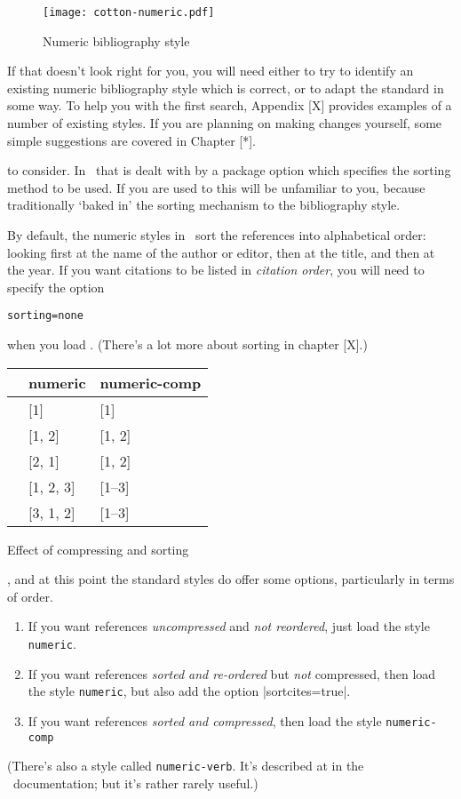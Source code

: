 \begin{figure}
\texttt{[image: cotton-numeric.pdf]}
\caption{Numeric bibliography style\label{numeric-examples}}
\end{figure}

If that doesn't look right for you, you will need either to try to
identify an existing numeric bibliography style which is correct, or
to adapt the standard in some way. To help you with the first search,
Appendix [X] provides examples of a number of existing styles. If you
are planning on making changes yourself, some simple suggestions are
covered in Chapter [*].

 to consider. In \biblatex\ that
is dealt with by a package option which specifies the sorting method
to be used. If you are used to  this will be
unfamiliar to you, because traditionally  `baked in'
the sorting mechanism to the bibliography style.

By default, the numeric styles in \biblatex\ sort the references into
alphabetical order: looking first at the name of the author or editor,
then at the title, and then at the year. If you want citations to be
listed in \emph{citation order}, you will need to specify the option
\begin{center}
\verb|sorting=none|
\end{center}

when you load \biblatex. (There's a lot more about sorting in chapter
[X].)


\begin{margintable}[4cm]
\begin{tabular}{lll}
\toprule
& \textsf{numeric} & \parbox{6ex}{\textsf{numeric-comp}} \\
\midrule{} & [1] & [1] \\
 & [1, 2] & [1, 2] \\
 & [2, 1] & [1, 2] \\
 & [1, 2, 3] & [1--3] \\
 & [3, 1, 2] & [1--3] \\
\bottomrule
\end{tabular}
\caption{Effect of compressing and sorting}
\end{margintable}
, and at
this point the standard styles do offer some options, particularly in
terms of order.
\begin{enumerate}
\item If you want references \emph{uncompressed} and \emph{not
    reordered}, just load the style \verb|numeric|.
\item If you want references \emph{sorted and re-ordered} but
  \emph{not} compressed, then load the style \verb|numeric|, but also
  add the option |sortcites=true|.
\item If you want references \emph{sorted and compressed}, then load the
  style \verb|numeric-comp|
\end{enumerate}
(There's also a style called
  \texttt{numeric-verb}. It's described at in the \biblatex\
  documentation; but it's rather rarely useful.)

